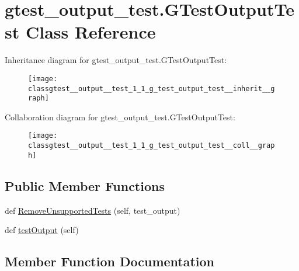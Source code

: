 \hypertarget{classgtest__output__test_1_1_g_test_output_test}{}\section{gtest\+\_\+output\+\_\+test.\+G\+Test\+Output\+Test Class Reference}
\label{classgtest__output__test_1_1_g_test_output_test}


Inheritance diagram for gtest\+\_\+output\+\_\+test.\+G\+Test\+Output\+Test\+:
\nopagebreak
\begin{figure}[H]
\begin{center}
\leavevmode
\texttt{[image: classgtest\_\_output\_\_test\_1\_1\_g\_test\_output\_test\_\_inherit\_\_graph]}
\end{center}
\end{figure}


Collaboration diagram for gtest\+\_\+output\+\_\+test.\+G\+Test\+Output\+Test\+:
\nopagebreak
\begin{figure}[H]
\begin{center}
\leavevmode
\texttt{[image: classgtest\_\_output\_\_test\_1\_1\_g\_test\_output\_test\_\_coll\_\_graph]}
\end{center}
\end{figure}
\subsection*{Public Member Functions}
\begin{DoxyCompactItemize}
\item 
def \hyperlink{classgtest__output__test_1_1_g_test_output_test_a63f62268f795adfc5ca91514dbec2873}{Remove\+Unsupported\+Tests} (self, test\+\_\+output)
\item 
def \hyperlink{classgtest__output__test_1_1_g_test_output_test_a1e6b96f68c5bcb8271de3208fa7f9f64}{test\+Output} (self)
\end{DoxyCompactItemize}


\subsection{Member Function Documentation}
